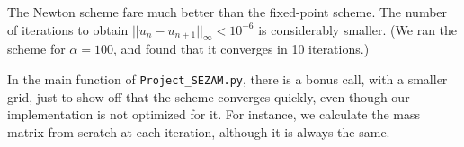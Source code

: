 \documentclass[11pt, a4paper, twoside]{article}
\begin{document}
The Newton scheme fare much better than the fixed-point scheme. The number of iterations to obtain $||u_n -u_{n+1}||_\infty < 10^{-6}$ is considerably smaller. (We ran the scheme for $\alpha=100$, and found that it converges in 10 iterations.)

In the main function of \verb+Project_SEZAM.py+, there is a bonus call, with a smaller grid, just to show off that the scheme converges quickly, even though our implementation is not optimized for it. For instance, we calculate the mass matrix from scratch at each iteration, although it is always the same.

\end{document}
